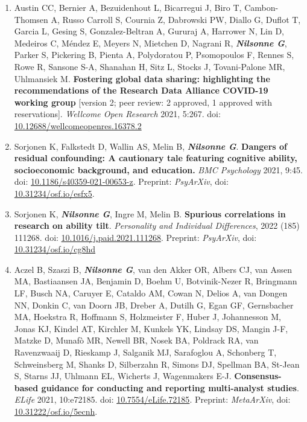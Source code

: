 \documentclass[10pt]{article}
\begin{document}
\begin{enumerate}[nolistsep]
\item Austin CC, Bernier A, Bezuidenhout L, Bicarregui J, Biro T, Cambon-Thomsen A, Russo Carroll S, Cournia Z, Dabrowski PW,  Diallo G, Duflot T, Garcia L, Gesing S, Gonzalez-Beltran A, Gururaj A, Harrower N, Lin D, Medeiros C, Méndez E, Meyers N, Mietchen D, Nagrani R, \textbf{\textit{Nilsonne G}}, Parker S, Pickering B, Pienta A, Polydoratou P, Psomopoulos F, Rennes S, Rowe R, Sansone S-A, Shanahan H, Sitz L, Stocks J, Tovani-Palone MR, Uhlmansiek M. \textbf{Fostering global data sharing: highlighting the recommendations of the Research Data Alliance COVID-19 working group} [version 2; peer review: 2 approved, 1 approved with reservations]. \emph{Wellcome Open Research} 2021, 5:267. doi: \href{https://doi.org/10.12688/wellcomeopenres.16378.2}{10.12688/wellcomeopenres.16378.2}
\item Sorjonen K, Falkstedt D, Wallin AS, Melin B, \textbf{\textit{Nilsonne G}}. \textbf{Dangers of residual confounding: A cautionary tale featuring cognitive ability, socioeconomic background, and education.} \emph{BMC Psychology} 2021, 9:45. doi: \href{https://doi.org/10.1186/s40359-021-00653-z}{10.1186/s40359-021-00653-z}. Preprint: \emph{PsyArXiv}, doi: \href{https://doi.org/10.31234/osf.io/esfx5}{10.31234/osf.io/esfx5}.
\item Sorjonen K, \textbf{\textit{Nilsonne G}}, Ingre M, Melin B. \textbf{Spurious correlations in research on ability tilt}. \emph{Personality and Individual Differences}, 2022 (185) 111268. doi: \href{https://doi.org/10.1016/j.paid.2021.111268}{10.1016/j.paid.2021.111268}. Preprint: \emph{PsyArXiv}, doi: \href{https://doi.org/10.31234/osf.io/cg8hd}{10.31234/osf.io/cg8hd}
\item Aczel B, Szaszi B, \textbf{\textit{Nilsonne G}}, van den Akker OR, Albers CJ, van Assen MA, Bastiaansen JA, Benjamin D, Boehm U, Botvinik-Nezer R, Bringmann LF, Busch NA, Caruyer E, Cataldo AM, Cowan N, Delios A, van Dongen NN, Donkin C, van Doorn JB, Dreber A, Dutilh G, Egan GF, Gernsbacher MA, Hoekstra R, Hoffmann S, Holzmeister F, Huber J, Johannesson M, Jonas KJ, Kindel AT, Kirchler M, Kunkels YK, Lindsay DS, Mangin J-F, Matzke D, Munafò MR, Newell BR, Nosek BA, Poldrack RA, van Ravenzwaaij D, Rieskamp J, Salganik MJ, Sarafoglou A, Schonberg T, Schweinsberg M, Shanks D, Silberzahn R, Simons DJ, Spellman BA, St-Jean S, Starns JJ, Uhlmann EL, Wicherts J, Wagenmakers E-J. \textbf{Consensus-based guidance for conducting and reporting multi-analyst studies}. \emph{ELife} 2021, 10:e72185. doi: \href{https://doi.org/10.7554/eLife.72185}{10.7554/eLife.72185}. Preprint: \emph{MetaArXiv}, doi: \href{https://doi.org/10.31222/osf.io/5ecnh}{10.31222/osf.io/5ecnh}.

\end{enumerate}
\end{document}
